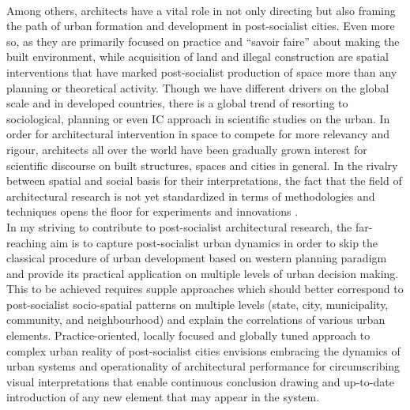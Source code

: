 \documentclass[11pt]{report}
\begin{document}
\\
Among others, architects have a vital role in not only directing but also framing the path of urban formation and development in post-socialist cities. Even more so, as they are primarily focused on practice and “savoir faire” about making the built environment, while acquisition of land and illegal construction are spatial interventions that have marked post-socialist production of space more than any planning or theoretical activity. Though we have different drivers on the global scale and in developed countries, there is a global trend of resorting to sociological, planning or even IC approach in scientific studies on the urban. 
In order for architectural intervention in space to compete for more relevancy and rigour,  architects all over the world have been gradually grown interest for scientific discourse on built structures, spaces and cities in general.  In the rivalry between spatial and social basis for their interpretations, the fact that the field of architectural research is not yet standardized in terms of methodologies and techniques opens the floor for experiments and innovations . 
\\
In my striving to contribute to post-socialist architectural research, the far-reaching aim is to capture post-socialist urban dynamics  in order to skip the classical procedure of urban development based on western planning paradigm and provide its practical application on multiple levels of urban decision making. This to be achieved requires supple  approaches which should better correspond to post-socialist socio-spatial patterns on multiple levels (state, city, municipality, community, and neighbourhood) and explain the correlations of various urban elements. Practice-oriented, locally focused and globally tuned  approach to complex urban reality of post-socialist cities envisions embracing the dynamics of urban systems and operationality of architectural performance for circumscribing visual interpretations that enable continuous conclusion drawing and up-to-date introduction of any new element that may appear in the system.
\end{document}
